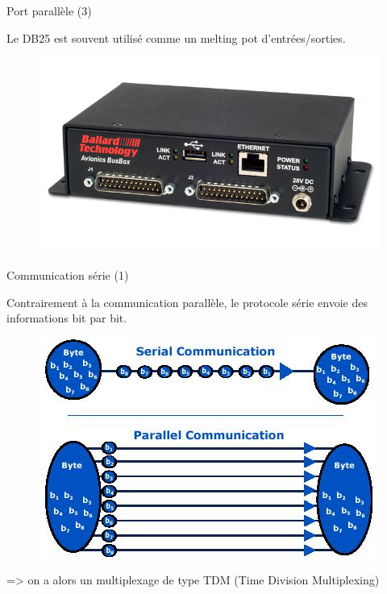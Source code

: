 \documentclass[12pt, t]{beamer}
\begin{document}
\begin{frame}{Port parallèle (3)}

    \vspace{15pt}
    Le DB25 est souvent utilisé comme un melting pot d'entrées/sorties.

    {
        \begin{figure}
            \centering
            \includegraphics[scale=0.35]{ballard.jpg}
        \end{figure}
    }

\end{frame}

\begin{frame}{Communication série (1)}

    \vspace{15pt}
    Contrairement à la communication parallèle, le protocole série envoie
    des informations bit par bit.

    {
        \vspace{15pt}
        \begin{figure}
            \centering
            \includegraphics[scale=0.5]{serial_vs_para.jpeg}
        \end{figure}
    }

    {
        => on a alors un multiplexage de type TDM (Time Division Multiplexing)
    }

\end{frame}
\end{document}
